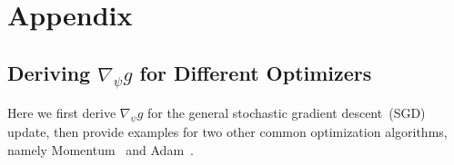 \section{\label{app} Appendix}

\subsection{\label{app:grad_of_optimizers}Deriving $\nabla_\psi g$ for Different Optimizers}

Here we first derive $\nabla_\psi g$ for the general stochastic gradient descent~(SGD) update, then provide examples for two other common optimization algorithms, namely Momentum~\citep{nesterov} and Adam~\citep{adam}.

